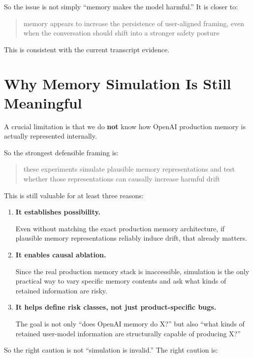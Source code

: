\documentclass[11pt]{article}
\begin{document}
So the issue is not simply ``memory makes the model harmful.'' It is closer to:

\begin{quote}
memory appears to increase the persistence of user-aligned framing, even when the conversation should shift into a stronger safety posture
\end{quote}

This is consistent with the current transcript evidence.

\section{Why Memory Simulation Is Still Meaningful}

A crucial limitation is that we do \textbf{not} know how OpenAI production memory is actually represented internally.

So the strongest defensible framing is:

\begin{quote}
these experiments simulate plausible memory representations and test whether those representations can causally increase harmful drift
\end{quote}

This is still valuable for at least three reasons:

\begin{enumerate}
  \item \textbf{It establishes possibility.}

  Even without matching the exact production memory architecture, if plausible memory representations reliably induce drift, that already matters.

  \item \textbf{It enables causal ablation.}

  Since the real production memory stack is inaccessible, simulation is the only practical way to vary specific memory contents and ask what kinds of retained information are risky.

  \item \textbf{It helps define risk classes, not just product-specific bugs.}

  The goal is not only ``does OpenAI memory do X?'' but also ``what kinds of retained user-model information are structurally capable of producing X?''
\end{enumerate}

So the right caution is not ``simulation is invalid.'' The right caution is:
\end{document}
